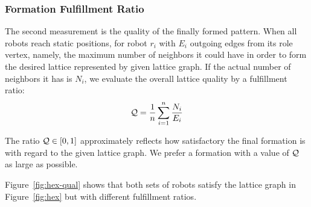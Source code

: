 \subsubsection{Formation Fulfillment Ratio}

The second measurement is the quality of the finally formed pattern.
%
When all robots reach static positions, for robot $r_i$
with $E_i$ outgoing edges from its role vertex, 
namely, the maximum number of neighbors it could have in order to form the desired lattice represented by given lattice graph. 
If the actual number of neighbors it has is $N_i$, 
we evaluate the overall lattice quality by a fulfillment ratio:
\begin{equation}\label{eq:gamma}
  \mathcal{Q} = \dfrac{1}{n}\sum\limits_{i=1}^n \frac{N_i}{E_i}
\end{equation}

The ratio $\mathcal{Q} \in [0, 1]$ approximately reflects how satisfactory the final formation is 
with regard to the given lattice graph. 
%
We prefer a formation with a value of $\mathcal{Q}$ as large as possible.

Figure~\ref{fig:hex-qual} shows that both sets of robots satisfy the lattice
graph in Figure~\ref{fig:hex} but with different fulfillment ratios.


